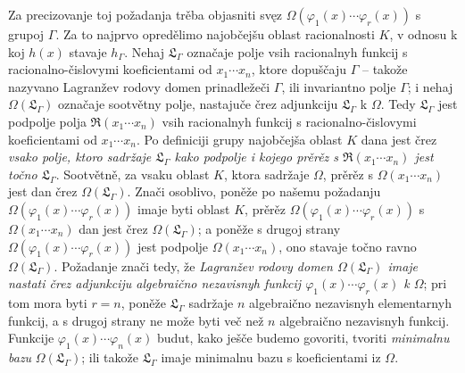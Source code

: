 \documentclass[11pt]{article}
\begin{document}
Za precizovanje toj požadanja trěba objasniti svęz $\Omega(\varphi_1(x)\cdots\varphi_r(x))$ s grupoj $\Gamma$. Za to najprvo opredělimo najobčejšu oblast racionalnosti $K$, v odnosu k koj $h(x)$ stavaje $h_\Gamma$. Nehaj $\mathfrak L_\Gamma$ označaje polje vsih racionalnyh funkcij s racionalno-čislovymi koeficientami od $x_1\cdots x_n$, ktore dopuščaju $\Gamma$ -- takože nazyvano Lagranžev rodovy domen prinadležeči $\Gamma$, ili invariantno polje $\Gamma$; i nehaj $\Omega(\mathfrak L_\Gamma)$ označaje sootvětny polje, nastajuče črez adjunkciju $\mathfrak L_\Gamma$ k $\Omega$. Tedy $\mathfrak L_\Gamma$ jest podpolje polja $\mathfrak R(x_1\cdots x_n)$ vsih racionalnyh funkcij s racionalno-čislovymi koeficientami od $x_1\cdots x_n$. Po definiciji grupy najobčejša oblast $K$ dana jest črez {\itshape vsako polje, ktoro sadržaje $\mathfrak L_\Gamma$ kako podpolje i kojego prěrěz s $\mathfrak R(x_1\cdots x_n)$ jest točno $\mathfrak L_\Gamma$}. Sootvětně, za vsaku oblast $K$, ktora sadržaje $\Omega$, prěrěz s $\Omega(x_1\cdots x_n)$ jest dan črez $\Omega(\mathfrak L_\Gamma)$. Znači osoblivo, poněže po našemu požadanju $\Omega(\varphi_1(x)\cdots\varphi_r(x))$ imaje byti oblast $K$, prěrěz $\Omega(\varphi_1(x)\cdots\varphi_r(x))$ s $\Omega(x_1\cdots x_n)$ dan jest črez $\Omega(\mathfrak L_\Gamma)$; a poněže s drugoj strany $\Omega(\varphi_1(x)\cdots\varphi_r(x))$ jest podpolje $\Omega(x_1\cdots x_n)$, ono stavaje točno ravno $\Omega(\mathfrak L_\Gamma)$. Požadanje znači tedy, že {\itshape Lagranžev rodovy domen $\Omega(\mathfrak L_\Gamma)$ imaje nastati črez adjunkciju algebraično nezavisnyh funkcij $\varphi_1(x)\cdots\varphi_r(x)$ k $\Omega$}; pri tom mora byti $r=n$, poněže $\mathfrak L_\Gamma$ sadržaje $n$ algebraično nezavisnyh elementarnyh funkcij, a s drugoj strany ne može byti več než $n$ algebraično nezavisnyh funkcij. Funkcije $\varphi_1(x)\cdots\varphi_n(x)$ budut, kako ješče budemo govoriti, tvoriti {\itshape minimalnu bazu} $\Omega(\mathfrak L_\Gamma)$; ili takože $\mathfrak L_\Gamma$ imaje minimalnu bazu s koeficientami iz $\Omega$.
\end{document}
